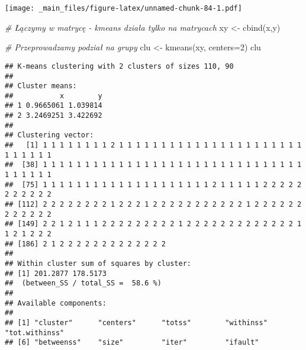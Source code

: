 \documentclass[
]{book}
\newenvironment{Shaded}{\begin{snugshade}}{\end{snugshade}}
\newcommand{\AttributeTok}[1]{\textcolor[rgb]{0.77,0.63,0.00}{#1}}
\newcommand{\CommentTok}[1]{\textcolor[rgb]{0.56,0.35,0.01}{\textit{#1}}}
\newcommand{\DecValTok}[1]{\textcolor[rgb]{0.00,0.00,0.81}{#1}}
\newcommand{\FunctionTok}[1]{\textcolor[rgb]{0.00,0.00,0.00}{#1}}
\newcommand{\NormalTok}[1]{#1}
\newcommand{\OtherTok}[1]{\textcolor[rgb]{0.56,0.35,0.01}{#1}}
\newcommand{\SpecialCharTok}[1]{\textcolor[rgb]{0.00,0.00,0.00}{#1}}
\begin{document}
\texttt{[image: \_main\_files/figure-latex/unnamed-chunk-84-1.pdf]}

\begin{Shaded}
\begin{Highlighting}[]
\CommentTok{\# Łączymy w matrycę {-} kmeans działa tylko na matrycach}
\NormalTok{xy }\OtherTok{\textless{}{-}} \FunctionTok{cbind}\NormalTok{(x,y)}

\CommentTok{\# Przeprowadzamy podział na grupy}
\NormalTok{clu }\OtherTok{\textless{}{-}} \FunctionTok{kmeans}\NormalTok{(xy, }\AttributeTok{centers=}\DecValTok{2}\NormalTok{)}
\NormalTok{clu}
\end{Highlighting}
\end{Shaded}

\begin{verbatim}
## K-means clustering with 2 clusters of sizes 110, 90
## 
## Cluster means:
##           x        y
## 1 0.9665061 1.039814
## 2 3.2469251 3.422692
## 
## Clustering vector:
##   [1] 1 1 1 1 1 1 1 1 2 1 1 1 1 1 1 1 1 1 1 1 1 1 1 1 1 1 1 1 1 1 1 1 1 1 1 1 1
##  [38] 1 1 1 1 1 1 1 1 1 1 1 1 1 1 1 1 1 1 1 1 1 1 1 1 1 1 1 1 1 1 1 1 1 1 1 1 1
##  [75] 1 1 1 1 1 1 1 1 1 1 1 1 1 1 1 1 1 1 1 1 2 1 1 1 1 1 2 2 2 2 2 2 2 2 2 2 2
## [112] 2 2 2 2 2 2 2 2 1 2 2 2 1 2 2 2 2 2 2 2 2 2 2 2 1 2 2 2 2 2 2 2 2 2 2 2 2
## [149] 2 2 1 2 1 1 1 2 2 2 2 2 2 2 2 2 1 2 2 2 2 2 2 2 2 2 2 2 2 2 1 1 2 1 2 2 2
## [186] 2 1 2 2 2 2 2 2 2 2 2 2 2 2 2
## 
## Within cluster sum of squares by cluster:
## [1] 201.2877 178.5173
##  (between_SS / total_SS =  58.6 %)
## 
## Available components:
## 
## [1] "cluster"      "centers"      "totss"        "withinss"     "tot.withinss"
## [6] "betweenss"    "size"         "iter"         "ifault"
\end{verbatim}

\begin{Shaded}
\end{Shaded}
\end{document}
